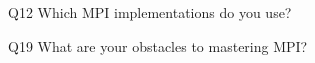 \begin{description}%
\item{Q12} Which MPI implementations do you use?%
\item{Q19} What are your obstacles to mastering MPI?%
\end{description}%
